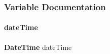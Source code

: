 \subsubsection{Variable Documentation}
\mbox{\label{a00035_a129e222d3019ef1ee0f6a7b86a51ae74}} 
\paragraph{date\+Time}
{\footnotesize\ttfamily \textbf{ Date\+Time} date\+Time}

